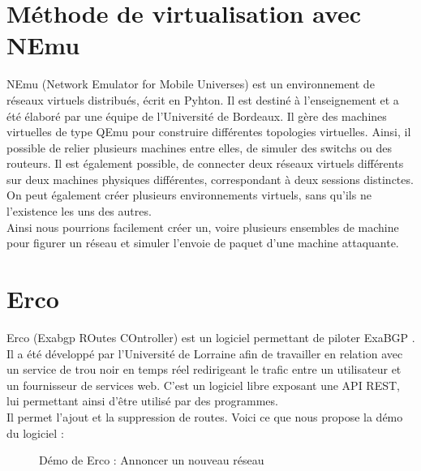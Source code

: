 \section{Méthode de virtualisation avec NEmu}
NEmu (Network Emulator for Mobile Universes) est un environnement de réseaux virtuels distribués, écrit en Pyhton. Il est destiné à l'enseignement et a été élaboré par une équipe de l'Université de Bordeaux. Il gère des machines virtuelles de type QEmu pour construire différentes topologies virtuelles. Ainsi, il possible de relier plusieurs machines entre elles, de simuler des switchs ou des routeurs. Il est également possible, de connecter deux réseaux virtuels différents sur deux machines physiques différentes, correspondant à deux sessions distinctes. On peut également créer plusieurs environnements virtuels, sans qu'ils ne l'existence les uns des autres.\\ \indent
Ainsi nous pourrions facilement créer un, voire plusieurs ensembles de machine pour figurer un réseau et simuler l'envoie de paquet d'une machine attaquante.

\section{Erco}
Erco (Exabgp ROutes COntroller) est un logiciel permettant de piloter ExaBGP \cite{Did15}. Il a été développé par l'Université de Lorraine afin de travailler en relation avec un service de trou noir en temps réel redirigeant le trafic entre un utilisateur et un fournisseur de services web. C'est un logiciel libre exposant une API REST, lui permettant ainsi d'être utilisé par des programmes.\\ \indent Il permet l'ajout et la suppression de routes. Voici ce que nous propose la démo du logiciel \cite{Erc16} :

\begin{figure}[H]
\caption{Démo de Erco : Annoncer un nouveau réseau}
\end{figure}

